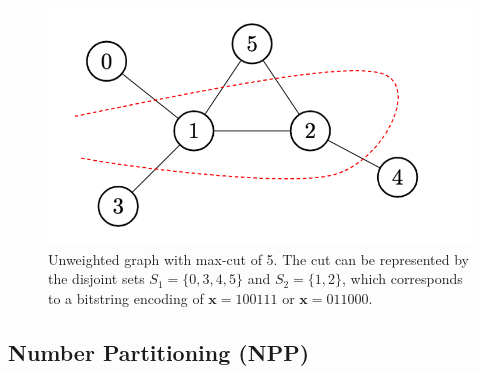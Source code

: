         \begin{figure}[H]

            \begin{center}
                \includegraphics[scale=0.3]{"figures/maxcut.png"}
            \end{center}
            \caption{Unweighted graph with max-cut of 5. The cut can be represented by the disjoint sets $S_1=\{0,3,4,5\}$ and $S_2=\{1,2\}$, which corresponds to a bitstring encoding of $\mathbf{x}=100111$ or $\mathbf{x}=011000$.}
            \label{fig:maxcut}
        \end{figure}

    \subsection{Number Partitioning (NPP)}

